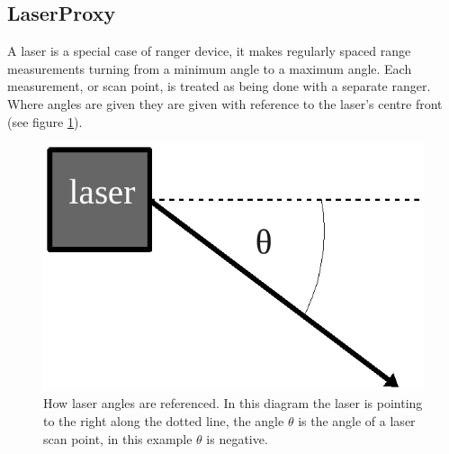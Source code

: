 \documentclass[a4paper]{report}
\begin{document}
\subsection{LaserProxy}\label{sec:Coding:InteractingWithProxies:Laser}
A laser is a special case of ranger device, it makes regularly spaced range measurements turning from a minimum angle to a maximum angle. Each measurement, or scan point, is treated as being done with a separate ranger. Where angles are given they are given with reference to the laser's centre front (see figure \ref{fig:Coding:InteractingWithProxies:Laser:Angles}).


\begin{figure}
	\centering
	\includegraphics[width=0.8\linewidth]{./pics/coding/laserscanner2.png}
	\caption{How laser angles are referenced. In this diagram the laser is pointing to the right along the dotted line, the angle $\theta$ is the angle of a laser scan point, in this example $\theta$ is negative.}
	\label{fig:Coding:InteractingWithProxies:Laser:Angles}
\end{figure} 
\end{document}
